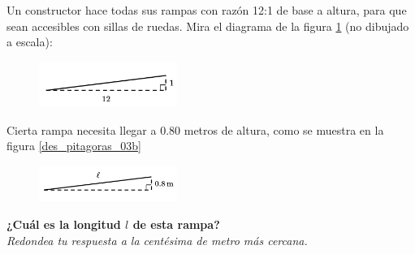 Un constructor hace todas sus rampas con razón 12:1 de base a altura,
para que sean accesibles con sillas de ruedas.
Mira el diagrama de la figura \ref{fig:des_pitagoras_03a} (no dibujado a escala):
\begin{figure}[H]
    \begin{center}
        \includegraphics[width=0.4\textwidth]{../images/des_pitagoras_03a.png}
    \end{center}
    \caption{}
    \label{fig:des_pitagoras_03a}
\end{figure}
Cierta rampa necesita llegar a 0.80 metros de altura, como se muestra en la figura \ref{des_pitagoras_03b}
\begin{figure}[H]
    \begin{center}
        \includegraphics[width=0.4\textwidth]{../images/des_pitagoras_03b.png}
    \end{center}
    \caption{}
    \label{fig:des_pitagoras_03b}
\end{figure}
\textbf{¿Cuál es la longitud $l$ de esta rampa?}\\
\textit{Redondea tu respuesta a la centésima de metro más cercana.}